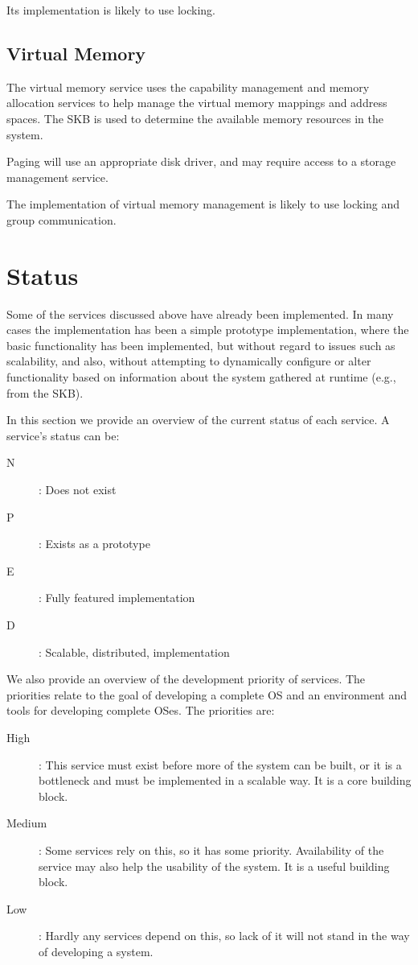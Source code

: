 \documentclass[a4paper,twoside]{report} %
\begin{document}
Its implementation is likely to use locking.


\subsection{Virtual Memory}

The virtual memory service uses the capability management and memory
allocation services to help manage the virtual memory mappings and
address spaces.  The SKB is used to determine the available memory
resources in the system.

Paging will use an appropriate disk driver, and may require access to
a storage management service.

The implementation of virtual memory management is likely to use
locking and group communication.


\section{Status}

Some of the services discussed above have already been implemented.
In many cases the implementation has been a simple prototype
implementation, where the basic functionality has been implemented,
but without regard to issues such as scalability, and also, without
attempting to dynamically configure or alter functionality based on
information about the system gathered at runtime (e.g., from the SKB).

In this section we provide an overview of the current status of each
service.  A service's status can be: 
\begin{description}
  \item[N]: Does not exist
  \item[P]: Exists as a prototype
  \item[E]: Fully featured implementation
  \item[D]: Scalable, distributed, implementation
\end{description}

We also provide an overview of the development priority of services.
The priorities relate to the goal of developing a complete OS and an
environment and tools for developing complete OSes.
The priorities are: 
\begin{description}
  \item[High]: This service must exist before more of the system can
    be built, or it is a bottleneck and must be implemented in a
    scalable way. It is a core building block.
  \item[Medium]: Some services rely on this, so it has some priority.
    Availability of the service may also help the usability of the
    system. It is a useful building block.
  \item[Low]: Hardly any services depend on this, so lack of it will
    not stand in the way of developing a system.
\end{description}
\end{document}
